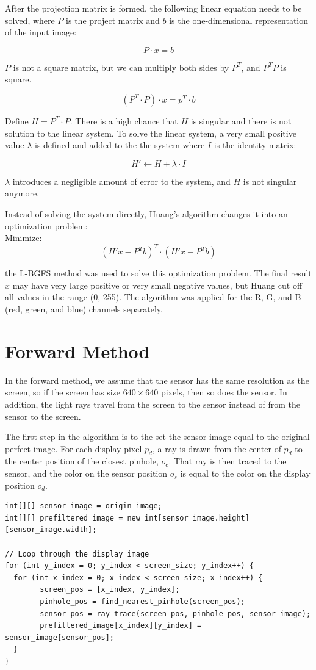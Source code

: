 After the projection matrix is formed, the following linear equation needs to be solved, where $P$ is the project matrix and $b$ is the one-dimensional representation of the input image:

$$P \cdot x = b$$

$P$ is not a square matrix, but we can multiply both sides by $P^{T}$, and $P^TP$ is square.

$$(P^T \cdot P) \cdot x = p^T \cdot b$$

Define $H = P^T \cdot P$. There is a high chance that $H$ is singular and there is not solution to the linear system. To solve the linear system, a very small positive value $\lambda$ is defined and added to the the system where $I$ is the identity matrix:

$$H' \leftarrow H + \lambda \cdot I$$

$\lambda$ introduces a negligible amount of error to the system, and $H$ is not singular anymore.

Instead of solving the system directly, Huang's algorithm changes it into an optimization problem: \\

Minimize: $$(H'x - P^Tb)^T \cdot (H'x-P^Tb)$$

the L-BGFS method was used to solve this optimization problem. The final result $x$ may have very large positive or very small negative values, but Huang cut off all values in the range (0, 255). The algorithm was applied for the R, G, and B (red, green, and blue) channels separately.


\section{Forward Method}

In the forward method, we assume that the sensor has the same resolution as the screen, so if the screen has size $640 \times 640$ pixels, then so does the sensor. In addition, the light rays travel from the screen to the sensor instead of from the sensor to the screen.

The first step in the algorithm is to the set the sensor image equal to the original perfect image. For each display pixel $p_d$, a ray is drawn from the center of $p_d$ to the center position of the closest pinhole, $o_c$. That ray is then traced to the sensor, and the color on the sensor position $o_s$ is equal to the color on the display position $o_d$. 

\lstset {language=C++}
\begin{lstlisting}[frame=single, caption=Pseudocode For Prefiltering Algorithm]
int[][] sensor_image = origin_image;
int[][] prefiltered_image = new int[sensor_image.height][sensor_image.width];

// Loop through the display image
for (int y_index = 0; y_index < screen_size; y_index++) {
  for (int x_index = 0; x_index < screen_size; x_index++) {
        screen_pos = [x_index, y_index];
        pinhole_pos = find_nearest_pinhole(screen_pos);
        sensor_pos = ray_trace(screen_pos, pinhole_pos, sensor_image);
        prefiltered_image[x_index][y_index] = sensor_image[sensor_pos];
  }
}
\end{lstlisting}

